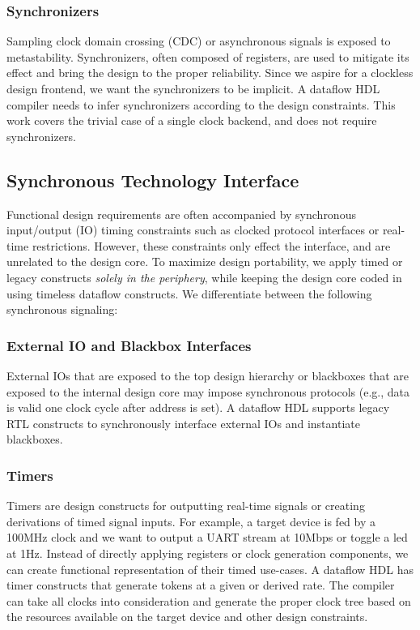 \subsubsection{Synchronizers}
Sampling clock domain crossing (CDC) or asynchronous signals is exposed to metastability. Synchronizers, often composed of registers, are used to mitigate its effect and bring the design to the proper reliability. Since we aspire for a clockless design frontend, we want the synchronizers to be implicit. A dataflow HDL compiler needs to infer synchronizers according to the design constraints. This work covers the trivial case of a single clock backend, and does not require synchronizers.

\subsection{Synchronous Technology Interface}
Functional design requirements are often accompanied by synchronous input/output (IO) timing constraints such as clocked protocol interfaces or real-time restrictions. However, these constraints only effect the interface, and are unrelated to the design core. To maximize design portability, we apply timed or legacy constructs \emph{solely in the periphery}, while keeping the design core coded in using timeless dataflow constructs. We differentiate between the following synchronous signaling:
\subsubsection{External IO and Blackbox Interfaces}
External IOs that are exposed to the top design hierarchy or blackboxes that are exposed to the internal design core may impose synchronous protocols (e.g., data is valid one clock cycle after address is set). A dataflow HDL supports legacy RTL constructs to synchronously interface external IOs and instantiate blackboxes. 
\subsubsection{Timers}
Timers are design constructs for outputting real-time signals or creating derivations of timed signal inputs. For example, a target device is fed by a 100MHz clock and we want to output a UART stream at 10Mbps or toggle a led at 1Hz. Instead of directly applying registers or clock generation components, we can create functional representation of their timed use-cases. A dataflow HDL has timer constructs that generate tokens at a given or derived rate. The compiler can take all clocks into consideration and generate the proper clock tree based on the resources available on the target device and other design constraints. 

